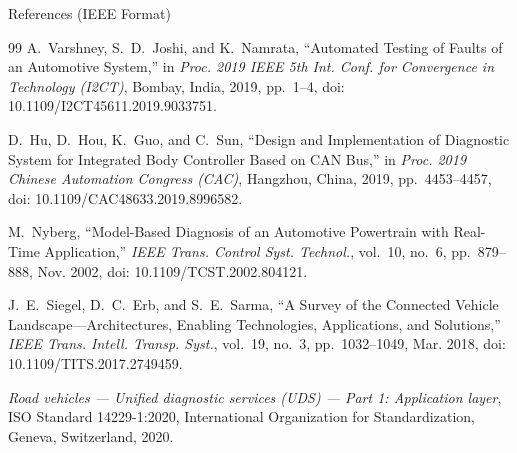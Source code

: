 \documentclass[aspectratio=169, 10pt]{beamer}
\begin{document}
\begin{frame}{References (IEEE Format)}
  \begin{thebibliography}{99}
    A.~Varshney, S.~D.~Joshi, and K.~Namrata, ``Automated Testing of Faults of an Automotive System,'' in \emph{Proc. 2019 IEEE 5th Int. Conf. for Convergence in Technology (I2CT)}, Bombay, India, 2019, pp.~1--4, doi: 10.1109/I2CT45611.2019.9033751.

    D.~Hu, D.~Hou, K.~Guo, and C.~Sun, ``Design and Implementation of Diagnostic System for Integrated Body Controller Based on CAN Bus,'' in \emph{Proc. 2019 Chinese Automation Congress (CAC)}, Hangzhou, China, 2019, pp.~4453--4457, doi: 10.1109/CAC48633.2019.8996582.

    M.~Nyberg, ``Model-Based Diagnosis of an Automotive Powertrain with Real-Time Application,'' \emph{IEEE Trans. Control Syst. Technol.}, vol.~10, no.~6, pp.~879--888, Nov. 2002, doi: 10.1109/TCST.2002.804121.

    J.~E.~Siegel, D.~C.~Erb, and S.~E.~Sarma, ``A Survey of the Connected Vehicle Landscape---Architectures, Enabling Technologies, Applications, and Solutions,'' \emph{IEEE Trans. Intell. Transp. Syst.}, vol.~19, no.~3, pp.~1032--1049, Mar. 2018, doi: 10.1109/TITS.2017.2749459.

    \emph{Road vehicles --- Unified diagnostic services (UDS) --- Part 1: Application layer}, ISO Standard 14229-1:2020, International Organization for Standardization, Geneva, Switzerland, 2020.
  \end{thebibliography}
\end{frame}
\end{document}
